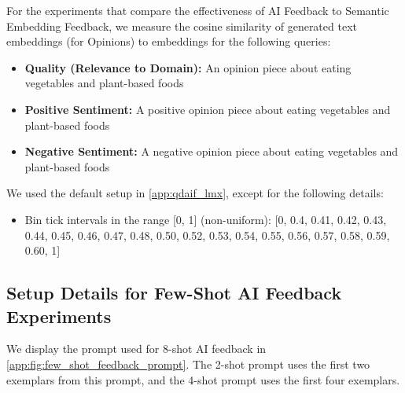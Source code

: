 For the experiments that compare the effectiveness of AI Feedback to Semantic Embedding Feedback, we measure the cosine similarity of generated text embeddings (for Opinions) to embeddings for the following queries:
\begin{itemize}
    \item \textbf{Quality (Relevance to Domain):} An opinion piece about eating vegetables and plant-based foods
    \item \textbf{Positive Sentiment:} A positive opinion piece about eating vegetables and plant-based foods
    \item \textbf{Negative Sentiment:} A negative opinion piece about eating vegetables and plant-based foods
\end{itemize}
We used the default setup in \cref{app:qdaif_lmx}, except for the following details:
\begin{itemize}
    \item Bin tick intervals in the range [0, 1] (non-uniform): [0, 0.4, 0.41, 0.42, 0.43, 0.44, 0.45, 0.46, 0.47, 0.48, 0.50, 0.52, 0.53, 0.54, 0.55, 0.56, 0.57, 0.58, 0.59, 0.60, 1]
\end{itemize}

\newpage

\subsection{Setup Details for Few-Shot AI Feedback Experiments}\label{app:few_shot_feedback_details}
We display the prompt used for 8-shot AI feedback in \cref{app:fig:few_shot_feedback_prompt}. The 2-shot prompt uses the first two exemplars from this prompt, and the 4-shot prompt uses the first four exemplars.

